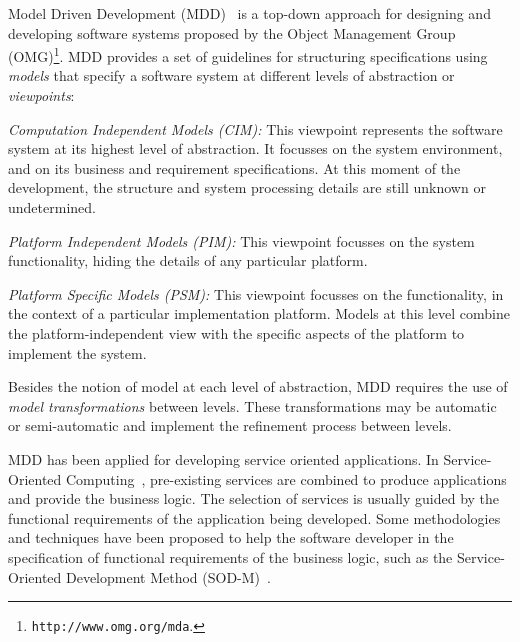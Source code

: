 Model Driven Development (MDD)~\cite{Favre06arigorous} is a top-down approach for  designing and developing software systems 
proposed by the Object Management Group
(OMG)\footnote{\texttt{http://www.omg.org/mda}.}. 
MDD provides a set of
guidelines for  structuring  specifications using
 \textit{models} that specify a software system at different levels of abstraction or \textit{viewpoints}: 
%
\begin{trivlist}
\item \textit{Computation Independent Models (CIM):} This viewpoint represents the software system at its highest level of abstraction. It focusses on the system
environment, and on its business and requirement specifications. 
At this moment of the development, the structure and system processing details are still unknown or undetermined. 
\item \textit{Platform Independent Models (PIM):} This viewpoint focusses on the system functionality, hiding the details of any particular platform. 
\item \textit{Platform Specific Models (PSM):} This viewpoint focusses on the functionality, in the context of a particular implementation platform.
Models at this level combine the platform-independent view with the specific aspects of the platform to implement the system.  
\end{trivlist}
%
Besides the notion of model at each level of abstraction, MDD requires the use of \textit{model transformations} between levels.
These transformations may be automatic or semi-automatic and implement the refinement process between levels. 

MDD has been applied for developing service oriented applications.
In Service-Oriented Computing~\cite{Papazoglou2007}, pre-existing services are
combined to produce applications and provide the business logic. The selection of services is usually guided by the functional requirements of the application being developed. 
Some methodologies and techniques have been proposed to help the software
developer in the specification of functional requirements of the business logic,
such as the Service-Oriented Development Method
(SOD-M)~\cite{decastro1}. 

